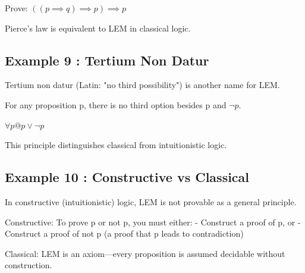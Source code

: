 \documentclass[a4paper,10pt,fleqn]{article}
\begin{document}
\noindent Prove: $((p \implies q) \implies p) \implies p$

\bigskip

\begin{center}
\end{center}
\bigskip

\noindent Pierce's law is equivalent to LEM in classical logic.

\bigskip

\subsection*{Example 9 : Tertium Non Datur}

\noindent Tertium non datur (Latin: "no third possibility") is another name for LEM.

\bigskip

\noindent For any proposition p, there is no third option besides p and $\lnot p$.

\bigskip

\noindent
$\forall p @ p \lor \lnot p$


\noindent This principle distinguishes classical from intuitionistic logic.

\bigskip

\subsection*{Example 10 : Constructive vs Classical}

\noindent In constructive (intuitionistic) logic, LEM is not provable as a general principle.

\bigskip

\noindent Constructive: To prove p or not p, you must either: - Construct a proof of p, or - Construct a proof of not p (a proof that p leads to contradiction)

\bigskip

\noindent Classical: LEM is an axiom—every proposition is assumed decidable without construction.

\bigskip
\end{document}
